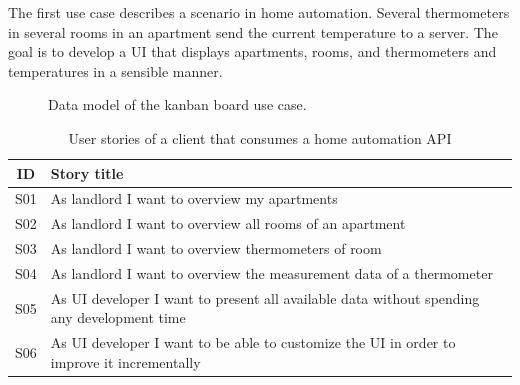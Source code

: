 The first use case describes a scenario in home automation. Several thermometers in several rooms in an apartment send the current temperature to a server. The goal is to develop a UI that displays apartments, rooms, and thermometers and temperatures in a sensible manner.

\begin{figure}[!htb]
  \caption{\label{fig:my-label} Data model of the kanban board use case.}
\end{figure}

\begin{table}
\begin{center}
\begin{tabular}{ |c|l| }
 \hline
 ID & Story title \\
 \hline
 S01 & As landlord I want to overview my apartments \\
 S02 & As landlord I want to overview all rooms of an apartment \\
 S03 & As landlord I want to overview thermometers of room \\
 S04 & As landlord I want to overview the measurement data of a thermometer \\
 S05 & As UI developer I want to present all available data without spending any development time \\
 S06 & As UI developer I want to be able to customize the UI in order to improve it incrementally \\
 \hline
\end{tabular}
\caption{User stories of a client that consumes a home automation API}
\end{center}
\end{table}

